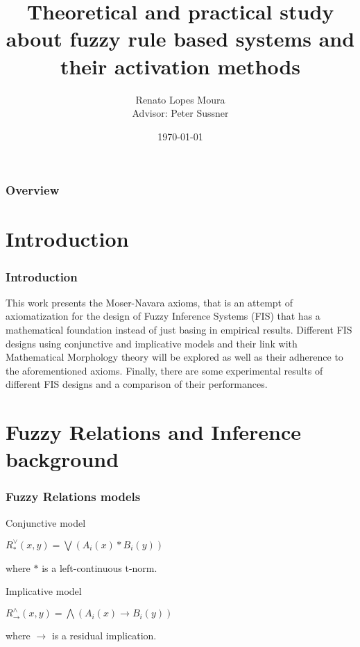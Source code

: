 \documentclass{beamer}
\title[FRBS and activation methods]{Theoretical and practical study about fuzzy rule based systems and their activation methods} %
\author[Renato Lopes Moura]{Renato Lopes Moura \\[5ex] 
\small Advisor: Peter Sussner} %
\institute[Unicamp] %
{
Universidade Estadual de Campinas \\ %
\medskip
\textit{ra163050@ime.unicamp.br} %
}
\date{\today} %
\begin{document}
\begin{frame}
\titlepage %
\end{frame}

\begin{frame}
\frametitle{Overview} %
\tableofcontents %
\end{frame}

\section{Introduction}
\begin{frame}
\frametitle{Introduction}
This work presents the Moser-Navara axioms, that is an attempt of axiomatization for the design of Fuzzy Inference Systems (FIS) that has a mathematical foundation instead of just basing in empirical results. Different FIS designs using conjunctive and implicative models and their link with Mathematical Morphology theory will be explored as well as their adherence to the aforementioned axioms. Finally, there are some experimental results of different FIS designs and a comparison of their performances.
\end{frame}


\section{Fuzzy Relations and Inference background}

\begin{frame}
\frametitle{Fuzzy Relations models}
\begin{block}{Conjunctive model}
\begin{center}
$R^{\vee}_{\ast}(x,y) = \bigvee (A_{i}(x) \ast B_{i}(y))$
\end{center}
where $\ast$ is a left-continuous t-norm.
\end{block}

\begin{block}{Implicative model}
\begin{center}
$R^{\wedge}_{\rightarrow}(x,y) = \bigwedge (A_{i}(x) \rightarrow B_{i}(y))$
\end{center}
where $\rightarrow$ is a residual implication.
\end{block}
\end{frame}
\end{document}
